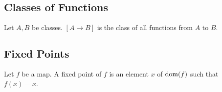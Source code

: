\documentclass[10pt]{article}
\begin{document}
  \subsection*{Classes of Functions}

  \begin{forthel}
    \begin{definition}[id=FOUNDATIONS_06_5119110467813376,printid]
      Let $A, B$ be classes.
      $[A \to B]$ is the class of all functions from $A$ to $B$.
    \end{definition}
  \end{forthel}


  \subsection*{Fixed Points}

  \begin{forthel}
    \begin{definition}[id=FOUNDATIONS_06_2177076576649216,printid]
      Let $f$ be a map.
      A fixed point of $f$ is an element $x$ of $\operatorname{dom}(f)$ such that $f(x) = x$.
    \end{definition}
  \end{forthel}
\end{document}
